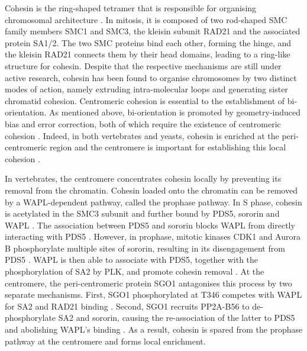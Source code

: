 Cohesin is the ring-shaped tetramer that is responsible for organising chromosomal architecture \citep{Nasmyth2009Cohesin:Mechanisms, Nasmyth2011Cohesin:Gates, Massari2023ChromosomeATPase}. In mitosis, it is composed of two rod-shaped SMC family members SMC1 and SMC3, the kleisin subunit RAD21 and the associated protein SA1/2. The two SMC proteins bind each other, forming the hinge, and the kleisin RAD21 connects them by their head domains, leading to a ring-like structure for cohesin. Despite that the respective mechanisms are still under active research, cohesin has been found to organise chromosomes by two distinct modes of action, namely extruding intra-molecular loops and generating sister chromatid cohesion. Centromeric cohesion is essential to the establishment of bi-orientation. As mentioned above, bi-orientation is promoted by geometry-induced bias and error correction, both of which require the existence of centromeric cohesion \citep{Tanaka2013}. Indeed, in both vertebrates and yeasts, cohesin is enriched at the peri-centromeric region and the centromere is important for establishing this local cohesion \citep{Tanaka1999IdentificationArms, Blat1999CohesinsRegion, Lengronne2004CohesinTranscription, Laloraya2000ChromosomalMcd1p, Glynn2004Genome-WideCerevisiae}. 

In vertebrates, the centromere concentrates cohesin locally by preventing its removal from the chromatin. Cohesin loaded onto the chromatin can be removed by a WAPL-dependent pathway, called the prophase pathway. In S phase, cohesin is acetylated in the SMC3 subunit and further bound by PDS5, sororin and WAPL \citep{Rankin2005SororinVertebrates, Schmitz2007SororinInterphase, Shintomi2009ReleasingSgo1, Lafont2010SororinCohesion, Nishiyama2010SororinWapl, Song2012CohesinMachinery, Hara2014, Ladurner2016SororinChromatidcohesion}. The association between PDS5 and sororin blocks WAPL from directly interacting with PDS5 \citep{Nishiyama2010SororinWapl, Liu2013}. However, in prophase, mitotic kinases CDK1 and Aurora B phosphorylate multiple sites of sororin, resulting in its disengagement from PDS5 \citep{Rankin2005SororinVertebrates, Shintomi2009ReleasingSgo1, Nishiyama2010SororinWapl, Dreier2011RegulationPhosphorylation, Nishiyama2013AuroraSororin}. WAPL is then able to associate with PDS5, together with the phosphorylation of SA2 by PLK, and promote cohesin removal \citep{Sumara2002TheKinase, Hauf2005DissociationSA2, McGuinness2005ShugoshinCells, Kueng2006WaplChromatin}. At the centromere, the peri-centromeric protein SGO1 antagonises this process by two separate mechanisms. First, SGO1 phosphorylated at T346 competes with WAPL for SA2 and RAD21 binding \citep{Liu2013, Hara2014, Garcia-Nieto2023StructuralProtection}. Second, SGO1 recruits PP2A-B56 to de-phosphorylate SA2 and sororin, causing the re-association of the latter to PDS5 and abolishing WAPL's binding \citep{Kitajima2006a, Tang2006a, Xu2009StructureInteraction, Dreier2011RegulationPhosphorylation, Nishiyama2013AuroraSororin, Hara2014}. As a result, cohesin is spared from the prophase pathway at the centromere and forms local enrichment. 

